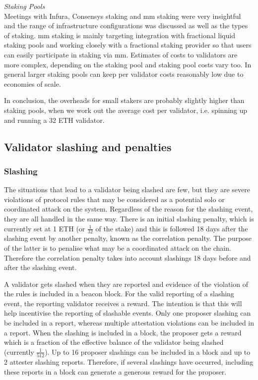 \documentclass[UTF8]{article}
\begin{document}
{\noindent
\textit{Staking Pools}\\
Meetings with Infura, Consensys staking and  \gls{mm} staking were very insightful and the range of infrastructure configurations was discussed as well as the types of staking. \gls{mm} staking is mainly targeting integration with fractional liquid staking pools and working closely with a fractional staking provider so that users can easily participate in staking via \gls{mm}.
Estimates of costs to validators are more complex, depending on the staking pool and staking pool costs vary too. In general larger staking pools can keep per validator costs reasonably low due to economies of scale.

In conclusion, the overheads for small stakers are probably slightly higher than staking pools, when we work out the average cost per validator, i.e. spinning up and running a 32 ETH validator. 

\subsection{Validator slashing and penalties}
\label{slashing}
\subsubsection*{Slashing}
The situations that lead to a validator being slashed are few, but they are severe violations of protocol rules that may be considered as a potential solo or coordinated attack on the system. Regardless of the reason for the slashing event, they are all handled in the same way. There is an initial slashing penalty, which is currently set at 1 ETH (or $\frac{1}{32}$ of the stake) and this is followed 18 days after the slashing event by another penalty, known as the correlation penalty. The purpose of the latter is to penalise what may be a coordinated attack on the chain. Therefore the correlation penalty takes into account slashings 18 days before and after the slashing event. 

A validator gets slashed when they are reported and evidence of the violation of the rules is included in a beacon block. For the valid reporting of a slashing event, the reporting validator receives a reward. The intention is that this will help incentivise the reporting of slashable events. Only one proposer slashing can be included in a report, whereas multiple attestation violations can be included in a report. When the slashing is included in a block, the proposer gets a reward which is a fraction of the effective balance of the validator being slashed (currently $\frac{1}{512}$). Up to 16 proposer slashings can be included in a block and up to 2 attester slashing reports.  Therefore, if several slashings have occurred, including these reports in a block can generate a generous reward for the proposer. 

}
\end{document}
